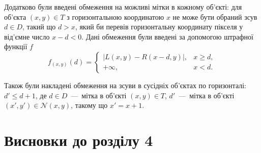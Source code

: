 
Додатково були введені обмеження на можливі мітки в кожному об'єкті:
для об'єкта $\left( x, y \right) \in T$ з горизонтальною координатою $x$
не може бути обраний зсув $d \in D$, такий що $d > x$,
який би перевів горизонтальну координату пікселя у від'ємне число $x - d < 0$.
Дані обмеження були введені за допомогою штрафної функції $f$
\begin{equation*}
    f_{\left(x, y \right)} \left( d \right) =
    \begin{cases}
        \left| L \left(x, y \right) - R \left(x - d, y \right) \right|,
            & x \ge d, \\
        + \infty, & x < d.
    \end{cases}
\end{equation*}


Також були накладені обмеження на зсуви в сусідніх об'єктах по горизонталі:
$d' \le d + 1$, де $d \in D$~---~мітка в об'єкті $\left(x, y \right) \in T$,
$d'$~---~мітка в об'єкті
$\left(x', y' \right) \in \mathcal{N} \left(x, y \right)$,
такому що $x' = x + 1$.




\section*{Висновки до розділу 4}

